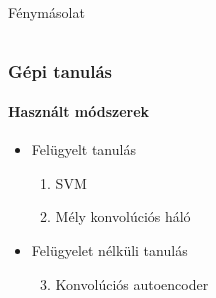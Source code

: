 \documentclass[11pt]{beamer}
\begin{document}
\begin{frame}
\begin{columns}[t]
\begin{column}{.5\textwidth}
			\centering
			Fénymásolat

		\end{column}				
	\end{columns}

%	
%		
%		
%		
%			
%			
%		

\end{frame}

\begin{frame}
	\frametitle{Gépi tanulás}
	\framesubtitle{Használt módszerek}
	
	\begin{itemize}
	\item 
		Felügyelt tanulás
		
		\begin{enumerate}
		\item 
			SVM	
		\item 
			Mély konvolúciós háló
		
		\end{enumerate}
		
	\item 
		Felügyelet nélküli tanulás
		
		\begin{enumerate}
		\setcounter{enumi}{2}
		\item 
			Konvolúciós autoencoder
		\end{enumerate}		
		
	\end{itemize}
\end{frame}
\end{document}
